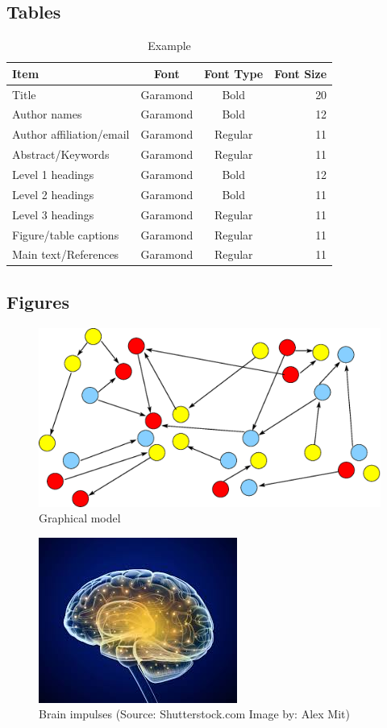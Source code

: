 \documentclass[11pt,a4paper]{article}
\begin{document}
\subsection{Tables}
\begin{table}[ht]
\centering
\caption{Example} 
\vspace{3mm}
\begin{tabular}{|l|c|c|r|} \hline
Item & Font & Font Type & Font Size \\ \hline
Title & Garamond & Bold & 20 \\
Author names & Garamond & Bold & 12 \\ 
Author affiliation/email & Garamond & Regular & 11 \\
Abstract/Keywords & Garamond & Regular & 11 \\
Level 1 headings & Garamond & Bold & 12 \\
Level 2 headings & Garamond & Bold & 11 \\
Level 3 headings & Garamond & Regular & 11 \\
Figure/table captions & Garamond & Regular & 11 \\
Main text/References & Garamond & Regular & 11 \\ \hline
\end{tabular}
\end{table}

\subsection{Figures}

\begin{figure}[ht]
	\begin{center}
		\includegraphics[width=0.7\linewidth]{gm.eps}
		\caption{Graphical model}
	\end{center}
\end{figure}

\begin{figure}[h!]
	\begin{center}
		\includegraphics[width=0.5\linewidth]{brain.jpg}
		\caption{Brain impulses (Source: Shutterstock.com Image by: Alex Mit)}
	\end{center}
\end{figure}
\end{document}
